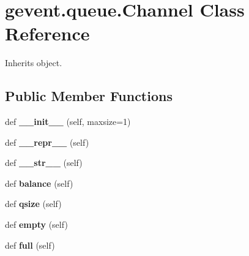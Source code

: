 \hypertarget{classgevent_1_1queue_1_1_channel}{}\section{gevent.\+queue.\+Channel Class Reference}
\label{classgevent_1_1queue_1_1_channel}


Inherits object.

\subsection*{Public Member Functions}
\begin{DoxyCompactItemize}
\item 
\mbox{\label{classgevent_1_1queue_1_1_channel_a119037f017699232e543502557aab5c1}} 
def {\bfseries \+\_\+\+\_\+init\+\_\+\+\_\+} (self, maxsize=1)
\item 
\mbox{\label{classgevent_1_1queue_1_1_channel_a7e28132b7ffcba1a5a0d5ee8df2ee2a8}} 
def {\bfseries \+\_\+\+\_\+repr\+\_\+\+\_\+} (self)
\item 
\mbox{\label{classgevent_1_1queue_1_1_channel_a7c193e58119312d4d635fa1d9944953b}} 
def {\bfseries \+\_\+\+\_\+str\+\_\+\+\_\+} (self)
\item 
\mbox{\label{classgevent_1_1queue_1_1_channel_aa1a45d4f9fe6b784e70b5a2cafa15419}} 
def {\bfseries balance} (self)
\item 
\mbox{\label{classgevent_1_1queue_1_1_channel_a2b80b198180b33159b1e52f1ed875efb}} 
def {\bfseries qsize} (self)
\item 
\mbox{\label{classgevent_1_1queue_1_1_channel_a3f8c662ba15520c60e912b6c2880ba16}} 
def {\bfseries empty} (self)
\item 
\mbox{\label{classgevent_1_1queue_1_1_channel_a546c83d3b146bf8e10b7a0ebd7f154b3}} 
def {\bfseries full} (self)
\item 
\mbox{\label{classgevent_1_1queue_1_1_channel_a01c422cda3177b25dd7555b252a1b768}} 

\end{DoxyCompactItemize}
